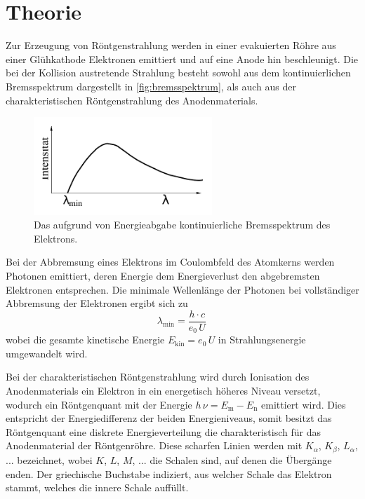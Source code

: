 \section{Theorie}
\label{sec:Theorie}

Zur Erzeugung von Röntgenstrahlung werden in einer evakuierten Röhre aus einer Glühkathode Elektronen emittiert
und auf eine Anode hin beschleunigt.
Die bei der Kollision austretende Strahlung besteht sowohl aus dem kontinuierlichen Bremsspektrum dargestellt in \autoref{fig:bremsspektrum}, 
als auch aus der charakteristischen Röntgenstrahlung des Anodenmaterials.
\begin{figure}
    \centering
    \includegraphics[width=0.6\textwidth]{pictures/bremsspektrum.pdf}
    \caption{Das aufgrund von Energieabgabe kontinuierliche Bremsspektrum des Elektrons. \cite{v602}}
    \label{fig:bremsspektrum}
\end{figure}
Bei der Abbremsung eines Elektrons im Coulombfeld des Atomkerns werden Photonen emittiert, 
deren Energie dem Energieverlust den abgebremsten Elektronen entsprechen.
Die minimale Wellenlänge der Photonen bei vollständiger Abbremsung der Elektronen ergibt sich zu
\begin{equation}
    \lambda_\text{min} = \frac{h \cdot c}{e_0 \, U} \,
\end{equation}
wobei die gesamte kinetische Energie $E_\text{kin} = e_0 \, U$ in Strahlungsenergie umgewandelt wird.

Bei der charakteristischen Röntgenstrahlung wird durch Ionisation des Anodenmaterials ein Elektron in ein energetisch höheres Niveau versetzt,
wodurch ein Röntgenquant mit der Energie $h \, \nu = E_\text{m} - E_\text{n}$ emittiert wird. 
Dies entspricht der Energiedifferenz der beiden Energieniveaus, 
somit besitzt das Röntgenquant eine diskrete Energieverteilung die charakteristisch für das Anodenmaterial der Röntgenröhre.
Diese scharfen Linien werden mit $K_\alpha$, $K_\beta$, $L_\alpha$, ... bezeichnet, wobei $K$, $L$, $M$, ... die Schalen sind, auf denen die Übergänge enden.
Der griechische Buchstabe indiziert, aus welcher Schale das Elektron stammt, welches die innere Schale auffüllt. 

